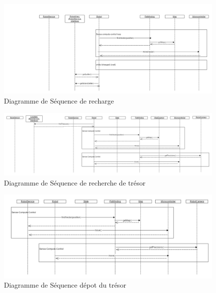 \begin{landscape}
\begin{figure}
  \centering
  \includegraphics[scale=0.5, angle=0]{resources/diagrams/rechargeState.png}
  \caption{Diagramme de Séquence de recharge}
\end{figure}

\begin{figure}
  \centering
  \includegraphics[scale=0.4, angle=0]{resources/diagrams/findTreasureState.png}
  \caption{Diagramme de Séquence de recherche de trésor}
\end{figure}

\begin{figure}
  \centering
  \includegraphics[scale=0.5, angle=0]{resources/diagrams/depositState.png}
  \caption{Diagramme de Séquence dépot du trésor}
\end{figure}
\end{landscape}
